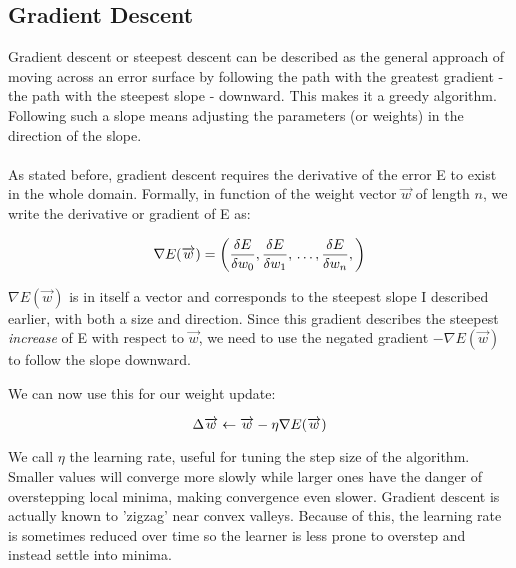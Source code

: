\subsection{Gradient Descent}
\label{sub:gradient_descent}

Gradient descent or steepest descent
can be described as the general approach
of moving across an error surface
by following the path with the greatest gradient
- the path with the steepest slope -
downward.
This makes it a greedy algorithm.
Following such a slope
means adjusting the parameters (or weights)
in the direction of the slope.

\paragraph{}
As stated before,
gradient descent requires the derivative of the error E
to exist in the whole domain.
Formally, in function of the weight vector
$\overrightarrow{w}$ of length $n$,
we write the derivative or gradient of E as:

\begin{equation}
\label{eq:gradient_descent_derivative}
  \nabla E(\overrightarrow{w}) = \left(
    \frac{\delta E}{\delta w_0}, \\
    \frac{\delta E}{\delta w_1}, \\
    \dots, \\
    \frac{\delta E}{\delta w_n}, \\
  \right)
\end{equation}

$\nabla E(\overrightarrow{w})$
is in itself a vector and corresponds to the steepest slope
I described earlier,
with both a size and direction.
Since this gradient describes the steepest
\textit{increase}
of E with respect to $\overrightarrow{w}$,
we need to use the negated gradient
$-\nabla E(\overrightarrow{w})$
to follow the slope downward.

We can now use this for our weight update:

\begin{equation}
\Delta \overrightarrow{w} \leftarrow \overrightarrow{w} - \\
\eta \nabla E(\overrightarrow{w})
\label{eq:gradient_descent}
\end{equation}

We call $\eta$ the learning rate,
useful for tuning the step size of the algorithm.
Smaller values will converge more slowly
while larger ones have the danger of overstepping local minima,
making convergence even slower.
Gradient descent is actually known to 'zigzag'
near convex valleys.
Because of this,
the learning rate is sometimes reduced over time
so the learner is less prone to overstep
and instead settle into minima.


